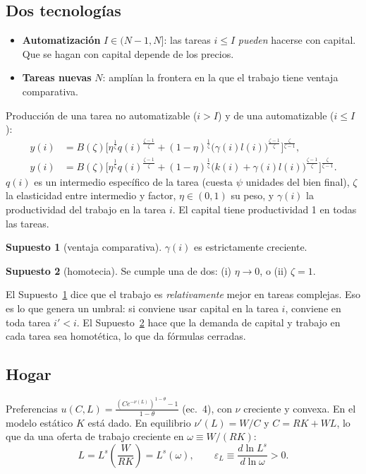 \documentclass[11pt,a4paper]{article}
\theoremstyle{definition}
\newtheorem{supuesto}{Supuesto}
\theoremstyle{plain}
\theoremstyle{remark}
\numberwithin{equation}{section}
\newcommand{\eps}{\varepsilon}
\begin{document}
\subsection{Dos tecnologías}
\begin{itemize}[nosep]
  \item \textbf{Automatización} $I\in(N-1,N]$: las tareas $i\le I$ \emph{pueden} hacerse con capital. Que se hagan
        con capital depende de los precios.
  \item \textbf{Tareas nuevas} $N$: amplían la frontera en la que el trabajo tiene ventaja comparativa.
\end{itemize}
Producción de una tarea no automatizable ($i>I$) y de una automatizable ($i\le I$):
\begin{align}
  y(i)&=B(\zeta)\Big[\eta^{\frac1\zeta}q(i)^{\frac{\zeta-1}{\zeta}}+(1-\eta)^{\frac1\zeta}\big(\gamma(i)l(i)\big)^{\frac{\zeta-1}{\zeta}}\Big]^{\frac{\zeta}{\zeta-1}}, \tag{ec.~2}\\
  y(i)&=B(\zeta)\Big[\eta^{\frac1\zeta}q(i)^{\frac{\zeta-1}{\zeta}}+(1-\eta)^{\frac1\zeta}\big(k(i)+\gamma(i)l(i)\big)^{\frac{\zeta-1}{\zeta}}\Big]^{\frac{\zeta}{\zeta-1}}. \tag{ec.~3}
\end{align}
$q(i)$ es un intermedio específico de la tarea (cuesta $\psi$ unidades del bien final), $\zeta$ la elasticidad
entre intermedio y factor, $\eta\in(0,1)$ su peso, y $\gamma(i)$ la productividad del trabajo en la tarea $i$. El
capital tiene productividad 1 en todas las tareas.

\begin{supuesto}[ventaja comparativa]\label{sup:1}
$\gamma(i)$ es estrictamente creciente.
\end{supuesto}
\begin{supuesto}[homotecia]\label{sup:2}
Se cumple una de dos: (i) $\eta\to0$, o (ii) $\zeta=1$.
\end{supuesto}

\begin{intuicion}
El Supuesto~\ref{sup:1} dice que el trabajo es \emph{relativamente} mejor en tareas complejas. Eso es lo que genera un
umbral: si conviene usar capital en la tarea $i$, conviene en toda tarea $i'<i$. El Supuesto~\ref{sup:2} hace que la
demanda de capital y trabajo en cada tarea sea homotética, lo que da fórmulas cerradas.
\end{intuicion}

\subsection{Hogar}
Preferencias $u(C,L)=\frac{(Ce^{-\nu(L)})^{1-\theta}-1}{1-\theta}$ (ec.~4), con $\nu$ creciente y convexa. En el
modelo estático $K$ está dado. En equilibrio $\nu'(L)=W/C$ y $C=RK+WL$, lo que da una oferta de trabajo creciente
en $\omega\equiv W/(RK)$:
\begin{equation}
  L=L^s\!\left(\frac{W}{RK}\right)=L^s(\omega), \qquad \eps_L\equiv\frac{d\ln L^s}{d\ln\omega}>0. \tag{ec.~11}
\end{equation}
\end{document}
